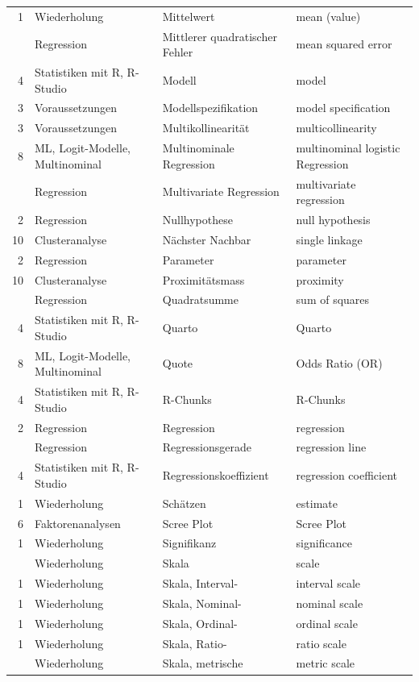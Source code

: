\documentclass[
  10pt,
  letterpaper,
  a4paper, twoside]{scrreprt}
\begin{document}
\begin{longtable*}{rlll}
1 & Wiederholung & Mittelwert & mean (value)\\
 & Regression & Mittlerer quadratischer Fehler & mean squared error\\
4 & Statistiken mit R, R-Studio & Modell & model\\
3 & Voraussetzungen & Modellspezifikation & model specification\\
3 & Voraussetzungen & Multikollinearität & multicollinearity\\
8 & ML, Logit-Modelle, Multinominal & Multinominale Regression & multinominal logistic Regression\\
 & Regression & Multivariate Regression & multivariate regression\\
2 & Regression & Nullhypothese & null hypothesis\\
10 & Clusteranalyse & Nächster Nachbar & single linkage\\
2 & Regression & Parameter & parameter\\
10 & Clusteranalyse & Proximitätsmass & proximity\\
 & Regression & Quadratsumme & sum of squares\\
4 & Statistiken mit R, R-Studio & Quarto & Quarto\\
8 & ML, Logit-Modelle, Multinominal & Quote & Odds Ratio (OR)\\
4 & Statistiken mit R, R-Studio & R-Chunks & R-Chunks\\
2 & Regression & Regression & regression\\
 & Regression & Regressionsgerade & regression line\\
4 & Statistiken mit R, R-Studio & Regressionskoeffizient & regression coefficient\\
1 & Wiederholung & Schätzen & estimate\\
6 & Faktorenanalysen & Scree Plot & Scree Plot\\
1 & Wiederholung & Signifikanz & significance\\
 & Wiederholung & Skala & scale\\
1 & Wiederholung & Skala, Interval- & interval scale\\
1 & Wiederholung & Skala, Nominal- & nominal scale\\
1 & Wiederholung & Skala, Ordinal- & ordinal scale\\
1 & Wiederholung & Skala, Ratio- & ratio scale\\
 & Wiederholung & Skala, metrische & metric scale\\

\end{longtable*}
\end{document}
